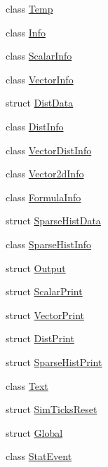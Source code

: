 \begin{DoxyCompactItemize}
\item 
class \hyperlink{classStats_1_1Temp}{Temp}
\item 
class \hyperlink{classStats_1_1Info}{Info}
\item 
class \hyperlink{classStats_1_1ScalarInfo}{ScalarInfo}
\item 
class \hyperlink{classStats_1_1VectorInfo}{VectorInfo}
\item 
struct \hyperlink{structStats_1_1DistData}{DistData}
\item 
class \hyperlink{classStats_1_1DistInfo}{DistInfo}
\item 
class \hyperlink{classStats_1_1VectorDistInfo}{VectorDistInfo}
\item 
class \hyperlink{classStats_1_1Vector2dInfo}{Vector2dInfo}
\item 
class \hyperlink{classStats_1_1FormulaInfo}{FormulaInfo}
\item 
struct \hyperlink{structStats_1_1SparseHistData}{SparseHistData}
\item 
class \hyperlink{classStats_1_1SparseHistInfo}{SparseHistInfo}
\item 
struct \hyperlink{structStats_1_1Output}{Output}
\item 
struct \hyperlink{structStats_1_1ScalarPrint}{ScalarPrint}
\item 
struct \hyperlink{structStats_1_1VectorPrint}{VectorPrint}
\item 
struct \hyperlink{structStats_1_1DistPrint}{DistPrint}
\item 
struct \hyperlink{structStats_1_1SparseHistPrint}{SparseHistPrint}
\item 
class \hyperlink{classStats_1_1Text}{Text}
\item 
struct \hyperlink{structStats_1_1SimTicksReset}{SimTicksReset}
\item 
struct \hyperlink{structStats_1_1Global}{Global}
\item 
class \hyperlink{classStats_1_1StatEvent}{StatEvent}
\end{DoxyCompactItemize}
